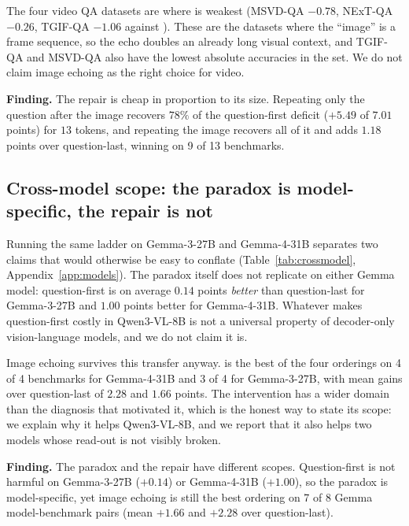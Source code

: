 The four video QA datasets are where \sitit{} is weakest (MSVD-QA $-0.78$,
NExT-QA $-0.26$, TGIF-QA $-1.06$ against \sit{}). These are the datasets where
the ``image'' is a frame sequence, so the echo doubles an already long visual
context, and TGIF-QA and MSVD-QA also have the lowest absolute accuracies in the
set. We do not claim image echoing as the right choice for video.

\begin{finding}
\textbf{Finding.} The repair is cheap in proportion to its size. Repeating only
the question after the image recovers $78\%$ of the question-first deficit
($+5.49$ of $7.01$ points) for $13$ tokens, and repeating the image recovers all
of it and adds $1.18$ points over question-last, winning on 9 of 13 benchmarks.
\end{finding}

\subsection{Cross-model scope: the paradox is model-specific, the repair is not}
\label{sec:crossmodel}

Running the same ladder on Gemma-3-27B and Gemma-4-31B separates two claims that
would otherwise be easy to conflate (Table~\ref{tab:crossmodel},
Appendix~\ref{app:models}). The paradox itself does not replicate on either
Gemma model: question-first is on average $0.14$ points \emph{better} than
question-last for Gemma-3-27B and $1.00$ points better for Gemma-4-31B. Whatever
makes question-first costly in Qwen3-VL-8B is not a universal property of
decoder-only vision-language models, and we do not claim it is.

Image echoing survives this transfer anyway. \sitit{} is the best of the four
orderings on 4 of 4 benchmarks for Gemma-4-31B and 3 of 4 for Gemma-3-27B, with
mean gains over question-last of $2.28$ and $1.66$ points. The intervention has a
wider domain than the diagnosis that motivated it, which is the honest way to
state its scope: we explain why it helps Qwen3-VL-8B, and we report that it also
helps two models whose read-out is not visibly broken.

\begin{finding}
\textbf{Finding.} The paradox and the repair have different scopes. Question-first
is not harmful on Gemma-3-27B ($+0.14$) or Gemma-4-31B ($+1.00$), so the paradox
is model-specific, yet image echoing is still the best ordering on 7 of 8
Gemma model-benchmark pairs (mean $+1.66$ and $+2.28$ over question-last).
\end{finding}
